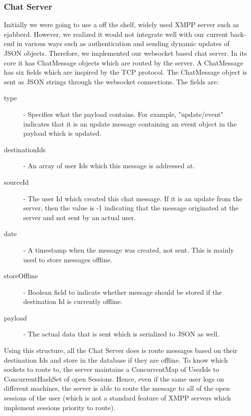 \documentclass[10pt,a4paper]{article}
\begin{document}
\subsubsection{Chat Server}
Initially we were going to use a off the shelf, widely used XMPP server such as 
ejabberd. However, we realized it would not integrate well with our current 
back-end in various ways such as authentication and sending dynamic updates of 
JSON objects. Therefore, we implemented our websocket based chat server. In its 
core it has ChatMessage objects which are routed by the server. A ChatMessage 
has six fields which are inspired by the TCP protocol. The ChatMessage object is 
sent as JSON strings through the websocket connections. The fields are:
\begin{description}
\item[type] - Specifies what the payload contains. For example, "update/event" 
indicates that it is an update message containing an event object in the payload 
which is updated.
\item[destinationIds] - An array of user Ids which this message is addressed at.
\item[sourceId] - The user Id which created this chat message. If it is an 
update from the server, then the value is -1 indicating that the message 
originated at the server and not sent by an actual user.
\item[date] - A timestamp when the message was created, not sent. This is mainly 
used to store messages offline.
\item[storeOffline] - Boolean field to indicate whether message should be stored 
if the destination Id is currently offline.
\item[payload] - The actual data that is sent which is serialized to JSON as 
well.
\end{description}

\noindent Using this structure, all the Chat Server does is route messages based on their 
destination Ids and store in the database if they are offline. To know which 
sockets to route to, the server maintains a ConcurrentMap of UserIds to 
ConcurrentHashSet of open Sessions. Hence, even if the same user logs on 
different machines, the server is able to route the message to all of the open 
sessions of the user (which is not a standard feature of XMPP servers which 
implement sessions priority to route).
\end{document}
